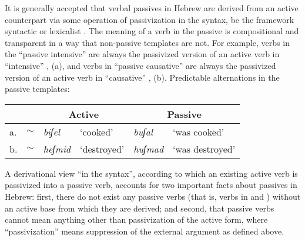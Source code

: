 It is generally accepted that verbal passives in Hebrew are derived from an active counterpart via some operation of passivization in the syntax, be the framework syntactic \citep{doron03,alexiadoudoron12,borer13oup} or lexicalist \citep{reinhartsiloni05,ussishkin05,laks11}. The meaning of a verb in the passive is compositional and transparent in a way that non-passive templates are not. For example, verbs in the ``passive intensive'' {\tpua} are always the passivized version of an active verb in ``intensive'' {\tpie}, (\nextx a), and verbs in ``passive causative'' {\thuf} are always the passivized version of an active verb in ``causative'' {\thif}, (\nextx b).
\ex Predictable alternations in the passive templates:\\
	\begin{tabular}{ll|ll|ll}
	& & \multicolumn{2}{c|}{Active} & \multicolumn{2}{c}{Passive} \\\hline
	a. & {\tpie} $\sim$ {\tpua} & \emph{biʃel} & `cooked' & \emph{buʃal} & `was cooked'\\
	b. & {\thif} $\sim$ {\thuf} & \emph{heʃmid} & `destroyed' & \emph{huʃmad} & `was destroyed'\\
	\end{tabular}
\xe

A derivational view ``in the syntax'', according to which an existing active verb is passivized into a passive verb, accounts for two important facts about passives in Hebrew: first, there do not exist any passive verbs (that is, verbs in {\tpua} and {\thuf}) without an active base from which they are derived; and second, that passive verbs cannot mean anything other than passivization of the active form, where ``passivization'' means suppression of the external argument as defined above.


